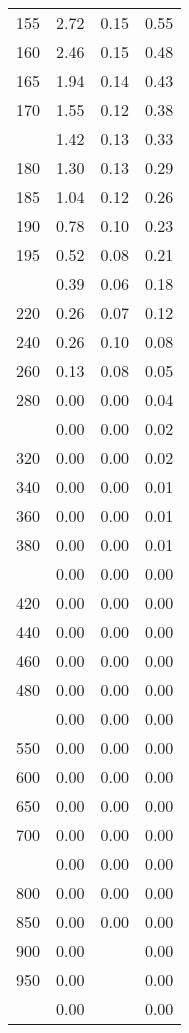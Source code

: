 \begin{table}[ht]
\begin{tabular}{lccc}
  155 & 2.72 & 0.15 & 0.55 \\ 
  160 & 2.46 & 0.15 & 0.48 \\ 
  165 & 1.94 & 0.14 & 0.43 \\ 
  170 & 1.55 & 0.12 & 0.38 \\ 
   \addlinespace
175 & 1.42 & 0.13 & 0.33 \\ 
  180 & 1.30 & 0.13 & 0.29 \\ 
  185 & 1.04 & 0.12 & 0.26 \\ 
  190 & 0.78 & 0.10 & 0.23 \\ 
  195 & 0.52 & 0.08 & 0.21 \\ 
   \addlinespace
200 & 0.39 & 0.06 & 0.18 \\ 
  220 & 0.26 & 0.07 & 0.12 \\ 
  240 & 0.26 & 0.10 & 0.08 \\ 
  260 & 0.13 & 0.08 & 0.05 \\ 
  280 & 0.00 & 0.00 & 0.04 \\ 
   \addlinespace
300 & 0.00 & 0.00 & 0.02 \\ 
  320 & 0.00 & 0.00 & 0.02 \\ 
  340 & 0.00 & 0.00 & 0.01 \\ 
  360 & 0.00 & 0.00 & 0.01 \\ 
  380 & 0.00 & 0.00 & 0.01 \\ 
   \addlinespace
400 & 0.00 & 0.00 & 0.00 \\ 
  420 & 0.00 & 0.00 & 0.00 \\ 
  440 & 0.00 & 0.00 & 0.00 \\ 
  460 & 0.00 & 0.00 & 0.00 \\ 
  480 & 0.00 & 0.00 & 0.00 \\ 
   \addlinespace
500 & 0.00 & 0.00 & 0.00 \\ 
  550 & 0.00 & 0.00 & 0.00 \\ 
  600 & 0.00 & 0.00 & 0.00 \\ 
  650 & 0.00 & 0.00 & 0.00 \\ 
  700 & 0.00 & 0.00 & 0.00 \\ 
   \addlinespace
750 & 0.00 & 0.00 & 0.00 \\ 
  800 & 0.00 & 0.00 & 0.00 \\ 
  850 & 0.00 & 0.00 & 0.00 \\ 
  900 & 0.00 &  & 0.00 \\ 
  950 & 0.00 &  & 0.00 \\ 
   \addlinespace
1000 & 0.00 &  & 0.00 \\ 
   \bottomrule
\end{tabular}
\end{table}
